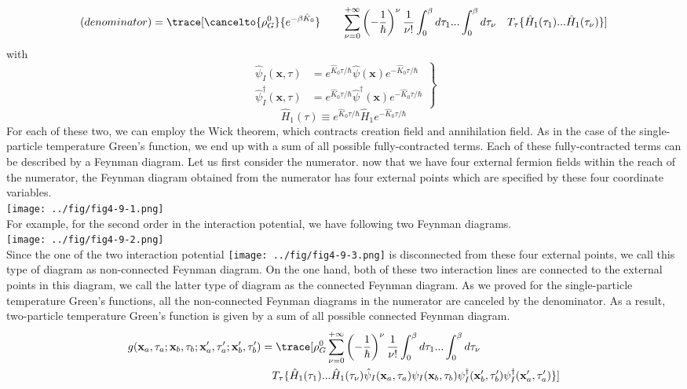 \begin{equation}
(denominator)=\trace [ \cancelto{\rho^0_G}{e^{-\beta\hat K_0}}\qquad\sum_{\nu=0}^{+\infty}\left( -\frac{1}{\hbar}\right)^\nu \frac{1}{\nu!}\int_0^{\beta}d\tau_1 ... \int_0^{\beta}d\tau_\nu\quad T_\tau\{ \hat H_1(\tau_1)...\hat H_1(\tau_\nu)  \}  ]
\end{equation}
with 
\[
\left.
\begin{aligned}
\hat\psi_I(\mathbf x,\tau)&=e^{\hat K_0\tau/\hbar} \hat \psi(\mathbf x)e^{-\hat K_0\tau/\hbar}\\
\hat\psi_I^\dag(\mathbf x,\tau)&=e^{\hat K_0\tau/\hbar} \hat \psi^\dag(\mathbf x)e^{-\hat K_0\tau/\hbar}
\end{aligned}
\right\}
\]
\begin{equation}
\hat H_1(\tau)\equiv e^{\hat K_0\tau/\hbar}\hat H_1e^{-\hat K_0\tau/\hbar}
\end{equation}
 For each of these two, we can employ the Wick theorem, which contracts creation field and annihilation field.
 As in the case of the single-particle temperature Green's function, we end up with a sum of all possible fully-contracted terms.
 Each of these fully-contracted terms can be described by a Feynman diagram.
 Let us first consider the numerator.
 now that we have four external fermion fields within the reach of the numerator, the Feynman diagram obtained from the numerator has four external points
which are specified by these four coordinate variables.\\
\texttt{[image: ../fig/fig4-9-1.png]}\\
 For example, for the second order in the interaction potential, we have following two Feynman diagrams.\\
\texttt{[image: ../fig/fig4-9-2.png]}\\
Since the one of the two interaction potential \texttt{[image: ../fig/fig4-9-3.png]} is disconnected from these four external points, we call this type of diagram
as non-connected Feynman diagram.
 On the one hand, both of these two interaction lines are connected to the external points in this diagram, we call the latter type of diagram as the connected Feynman diagram.
 As we proved for the single-particle temperature Green's functions, all the non-connected Feynman diagrams in the numerator are canceled by the denominator.
 As a result, two-particle temperature Green's function is given by a sum of all possible connected Feynman diagram.
\begin{equation}
\begin{aligned}
g(\mathbf x_a,\tau_a;\mathbf x_b,\tau_b;\mathbf x_a',\tau_a';\mathbf x_b',\tau_b')&=\trace [ \rho^0_G \sum_{\nu=0}^{+\infty}\left( -\frac{1}{\hbar}\right)^\nu \frac{1}{\nu!}\int_0^{\beta}d\tau_1 ... \int_0^{\beta}d\tau_\nu\\
&\quad  T_\tau\{ \hat H_1(\tau_1)...\hat H_1(\tau_\nu) \hat\psi_I(\mathbf x_a,\tau_a) \psi_I(\mathbf x_b,\tau_b) \psi_I^\dag(\mathbf x_b',\tau_b') \psi_I^\dag(\mathbf x_a',\tau_a') \}  ]
\end{aligned}
\end{equation}
